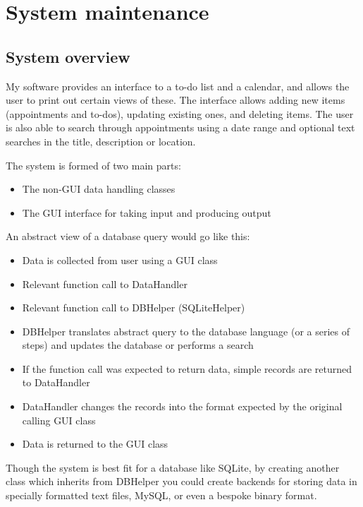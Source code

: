 \section{System maintenance}
\subsection{System overview}

My software provides an interface to a to-do list and a calendar, and allows the
user to print out certain views of these. The interface allows adding new items
(appointments and to-dos), updating existing ones, and deleting items. The user
is also able to search through appointments using a date range and optional text
searches in the title, description or location.

The system is formed of two main parts:

\begin{itemize}
    \item The non-GUI data handling classes
    \item The GUI interface for taking input and producing output
\end{itemize}

An abstract view of a database query would go like this:

\begin{itemize}
    \item Data is collected from user using a GUI class
    \item Relevant function call to DataHandler
    \item Relevant function call to DBHelper (SQLiteHelper)
    \item DBHelper translates abstract query to the database language (or
        a series of steps) and updates the database or performs a search
    \item If the function call was expected to return data, simple records are
        returned to DataHandler
    \item DataHandler changes the records into the format expected by the
        original calling GUI class
    \item Data is returned to the GUI class
\end{itemize}

Though the system is best fit for a database like SQLite, by creating another
class which inherits from DBHelper you could create backends for storing data in
specially formatted text files, MySQL, or even a bespoke binary format.


